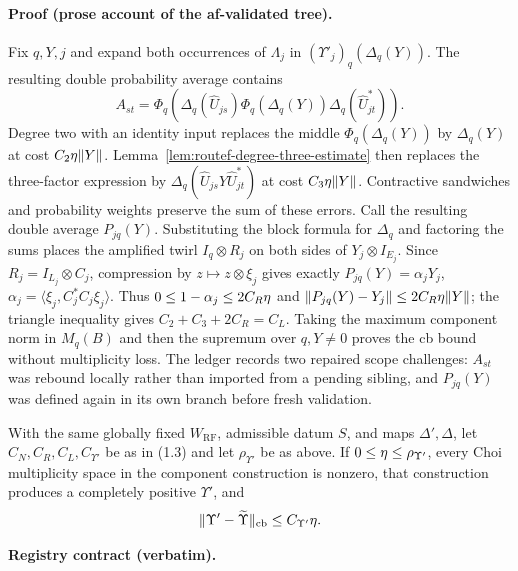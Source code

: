 \paragraph{Proof (prose account of the af-validated tree).}
Fix $q,Y,j$ and expand both occurrences of $\Lambda_j$ in $(\Upsilon'_j)_q(\Delta_q(Y))$.
The resulting double probability average contains
\[
 A_{st}=\Phi_q\!\left(\Delta_q(\widehat U_{js})
 \Phi_q(\Delta_q(Y))\Delta_q(\widehat U_{jt}^{*})\right).
\]
Degree two with an identity input replaces the middle $\Phi_q(\Delta_q(Y))$ by
$\Delta_q(Y)$ at cost $C_2\eta\lVert Y\rVert$.  Lemma~\ref{lem:routef-degree-three-estimate}
then replaces the three-factor expression by $\Delta_q(\widehat U_{js}Y\widehat U_{jt}^{*})$
at cost $C_3\eta\lVert Y\rVert$.  Contractive sandwiches and probability weights preserve
the sum of these errors.  Call the resulting double average $P_{jq}(Y)$.
Substituting the block formula for $\Delta_q$ and factoring the sums places the amplified
twirl $I_q\otimes R_j$ on both sides of $Y_j\otimes I_{E_j}$.  Since
$R_j=I_{L_j}\otimes C_j$, compression by $z\mapsto z\otimes\xi_j$ gives exactly
$P_{jq}(Y)=\alpha_jY_j$, $\alpha_j=\langle\xi_j,C_j^*C_j\xi_j\rangle$.
Thus $0\le1-\alpha_j\le2C_R\eta$ and
$\lVert P_{jq}(Y)-Y_j\rVert\le2C_R\eta\lVert Y\rVert$; the triangle inequality gives
$C_2+C_3+2C_R=C_L$.  Taking the maximum component norm in $M_q(B)$ and then the
supremum over $q,Y\ne0$ proves the cb bound without multiplicity loss.  The ledger records
two repaired scope challenges: $A_{st}$ was rebound locally rather than imported from a
pending sibling, and $P_{jq}(Y)$ was defined again in its own branch before fresh validation.
\begin{lemma}\label{lem:routef-upsilon-prime-closeness}
With the same globally fixed $W_{\mathrm{RF}}$, admissible datum $S$, and maps
$\Delta',\Delta$, let $C_N,C_R,C_L,C_{\Upsilon'}$ be as in (1.3) and let
$\rho_{\Upsilon'}$ be as above.  If $0\le\eta\le\rho_{\Upsilon'}$, every Choi
multiplicity space in the component construction is nonzero, that construction
produces a completely positive $\Upsilon'$, and
\[
 \lVert \Upsilon'-\widetilde\Upsilon\rVert_{\mathrm{cb}}\le C_{\Upsilon'}\eta.
\]
\end{lemma}

\noindent\textbf{Registry contract (verbatim).}

